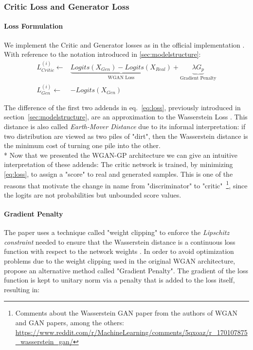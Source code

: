 \subsubsection{Critic Loss and Generator Loss}
\paragraph{Loss Formulation}
We implement the Critic and Generator losses as in the  official implementation \cite{wgangp-imple}. With reference to the notation introduced in \ref{sec:modelstructure}:
\begin{equation}
\label{eq:loss}
 \begin{split}
L_{Critic}^{(i)} \gets & \underbrace{Logits(X_{Gen}) - Logits(X_{Real})}_{\text{WGAN Loss}} + \underbrace {\lambda G_p}_{\text{Gradient Penalty}} \\
L_{Gen}^{(i)} \gets & -Logits(X_{Gen}) 
\end{split}
\end{equation}



The difference of the first two addends in eq.~\ref{eq:loss}, previously introduced in section~\ref{sec:modelstructure}, are an approximation to the Wasserstein Loss \cite[\S~3]{wgan}. This distance is also called \textit{Earth-Mover Distance} due to its informal interpretation: if two distribution are viewed as two piles of "dirt", then the Wasserstein distance is the minimum cost of turning one pile into the other. \\*
Now that we presented the WGAN-GP architecture we can give an intuitive interpretation of these addends: The critic network is trained, by minimizing \ref{eq:loss}, to assign a "score" to real and generated samples. This is one of the reasons that motivate the change in name from "discriminator" to "critic"~\footnote{ Comments about the Wasserstein GAN paper from the authors of WGAN and GAN papers, among the others: \url{https://www.reddit.com/r/MachineLearning/comments/5qxoaz/r_170107875_wasserstein_gan/}}, since the logits are not probabilities but unbounded score values.

\paragraph{Gradient Penalty} The  paper uses a technique called "weight clipping" to enforce the \textit{Lipschitz constraint} needed to ensure that the Wasserstein distance is a continuous loss function with respect to the network weights \cite[\S2]{wgan}. In order to avoid optimization problems due to the weight clipping used in the original WGAN architecture, \cite{wgangp} propose an alternative method called "Gradient Penalty". The gradient of the loss function is kept to unitary norm via a penalty that is added to the loss itself, resulting in:

